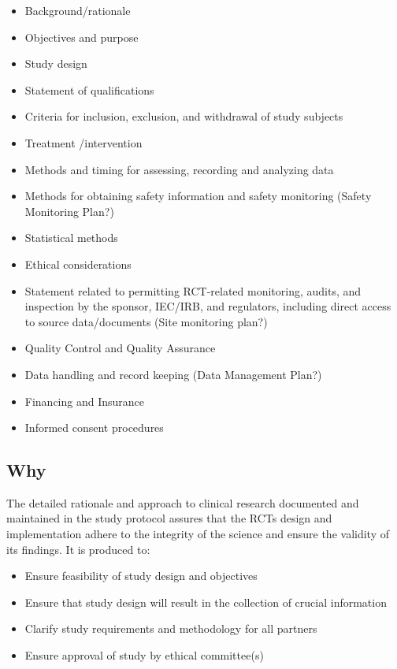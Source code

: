 \documentclass[]{book}
\providecommand{\tightlist}{%
  \setlength{\itemsep}{0pt}\setlength{\parskip}{0pt}}
\begin{document}
\begin{itemize}
\tightlist
\item
  Background/rationale
\item
  Objectives and purpose
\item
  Study design
\item
  Statement of qualifications
\item
  Criteria for inclusion, exclusion, and withdrawal of study subjects
\item
  Treatment /intervention
\item
  Methods and timing for assessing, recording and analyzing data
\item
  Methods for obtaining safety information and safety monitoring (Safety
  Monitoring Plan?)
\item
  Statistical methods
\item
  Ethical considerations
\item
  Statement related to permitting RCT-related monitoring, audits, and
  inspection by the sponsor, IEC/IRB, and regulators, including direct
  access to source data/documents (Site monitoring plan?)
\item
  Quality Control and Quality Assurance
\item
  Data handling and record keeping (Data Management Plan?)
\item
  Financing and Insurance
\item
  Informed consent procedures
\end{itemize}

\subsection{Why}\label{why-11}

The detailed rationale and approach to clinical research documented and
maintained in the study protocol assures that the RCTs design and
implementation adhere to the integrity of the science and ensure the
validity of its findings. It is produced to:

\begin{itemize}
\tightlist
\item
  Ensure feasibility of study design and objectives
\item
  Ensure that study design will result in the collection of crucial
  information
\item
  Clarify study requirements and methodology for all partners
\item
  Ensure approval of study by ethical committee(s)
\end{itemize}
\end{document}

